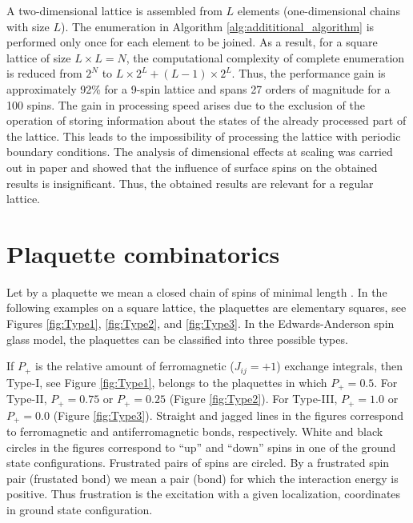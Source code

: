 \documentclass[preprint,12pt]{elsarticle}
\begin{document}
	A two-dimensional lattice is assembled from $L$ elements (one-dimensional chains with size $L$). The enumeration in Algorithm \ref{alg:addititional_algorithm} is performed only once for each element to be joined. As a result, for a square lattice of size $L \times L = N$, the computational complexity of complete enumeration is reduced from $2^{N}$ to $L \times 2^L + (L - 1) \times 2^L$. Thus, the performance gain is approximately 92\% for a 9-spin lattice and spans 27 orders of magnitude for a 100 spins. The gain in processing speed arises due to the exclusion of the operation of storing information about the states of the already processed part of the lattice. This leads to the impossibility of processing the lattice with periodic boundary conditions. The analysis of dimensional effects at scaling was carried out in paper \cite{trukhin2024thermodynamic} and showed that the influence of surface spins on the obtained results is insignificant. Thus, the obtained results are relevant for a regular lattice.
	
	\section{Plaquette combinatorics}
	
	Let by a plaquette we mean a closed chain of spins of minimal length \cite{lebrecht2015j}. In the following examples on a square lattice, the plaquettes are elementary squares, see Figures \ref{fig:Type1}, \ref{fig:Type2}, and \ref{fig:Type3}. In the Edwards-Anderson spin glass model, the plaquettes can be classified into three possible types. 
	
	If $P_+$ is the relative amount of ferromagnetic ($J_{ij}=+1$) exchange integrals, then Type-I, see Figure \ref{fig:Type1}, belongs to the plaquettes in which $P_+=0.5$. For Type-II, $P_+=0.75$ or $P_+=0.25$ (Figure \ref{fig:Type2}). For Type-III, $P_+=1.0$ or $P_+=0.0$ (Figure \ref{fig:Type3}). Straight and jagged lines in the figures correspond to ferromagnetic and antiferromagnetic bonds, respectively. White and black circles in the figures correspond to ``up'' and ``down'' spins in one of the ground state configurations. Frustrated pairs of spins are circled. By a frustrated spin pair (frustated bond) we mean a pair (bond) for which the interaction energy is positive. Thus frustration is the excitation with a given localization, coordinates in ground state configuration.
	
\end{document}

